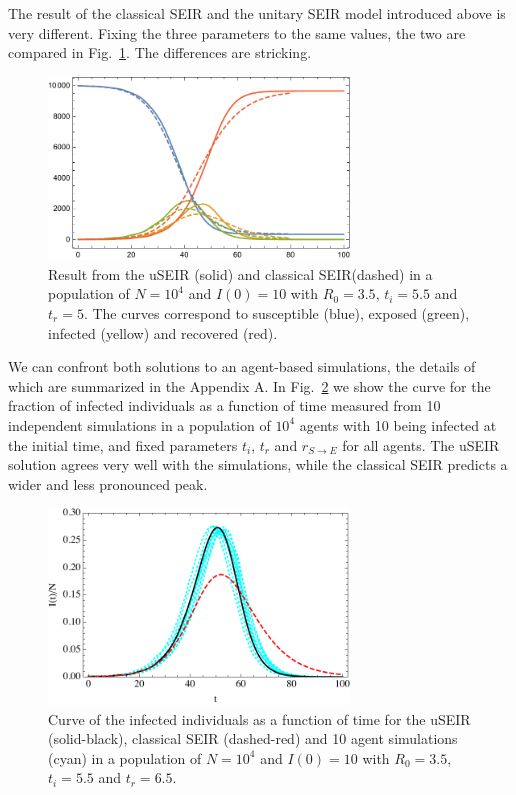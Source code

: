 \documentclass[a4paper,oneside,11pt]{article}
\begin{document}
The result of the classical SEIR and the unitary SEIR model introduced above is very different. Fixing the three parameters to the same values, the two are compared in Fig.~\ref{fig:seirvsuseir}. The differences are stricking. 
\begin{figure}[h!]
  \centering
  \includegraphics[width=8cm]{seirvsuseir.pdf}
  \caption{ Result from the uSEIR (solid) and classical SEIR(dashed) in a  population of $N=10^4$ and $I(0)=10$ with $R_0=3.5$, $t_i=5.5$ and $t_r=5$. The curves correspond to 
  susceptible (blue), exposed (green), infected (yellow) and recovered (red).  }
  \label{fig:seirvsuseir}
   \end{figure}  
  
  
  We can confront both solutions to an agent-based simulations, the details of which are summarized in the Appendix A. 
In Fig.~\ref{fig:fixed} we show the curve for the fraction of infected individuals as a function of time measured from 10 independent simulations in a population of $10^4$ agents with 10 being infected at the initial time, and fixed parameters $t_i$, $t_r$ and $r_{S\rightarrow E}$ for all agents. 
The uSEIR solution agrees very well with the simulations, while the classical SEIR predicts a wider and less pronounced peak. 

\begin{figure}[h!]
  \centering
  \includegraphics[width=8cm]{fixedraw.pdf}
  \caption{ Curve of the infected individuals as a function of time for the uSEIR (solid-black), classical SEIR (dashed-red) and 10 agent simulations (cyan) in a  population of $N=10^4$ and $I(0)=10$ with $R_0=3.5$, $t_i=5.5$ and $t_r=6.5$.  }
  \label{fig:fixed}
   \end{figure}  
   
\end{document}
